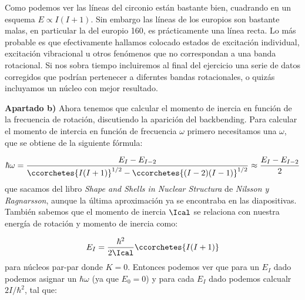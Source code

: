     Como podemos ver las líneas del circonio están bastante bien, cuadrando en un esquema $E \propto I(I+1)$. Sin embargo las líneas de los europios son bastante malas, en particular la del europio 160, es prácticamente una línea recta. Lo más probable es que efectivamente hallamos colocado estados de excitación individual, excitación vibracional u otros fenómenos que no correspondan a una banda rotacional. Si nos sobra tiempo incluiremos al final del ejercicio una serie de datos corregidos que podrían pertenecer a diferntes bandas rotacionales, o quizás incluyamos un núcleo con mejor resultado.


    \textbf{Apartado b)} Ahora tenemos que calcular el momento de inercia en función de la frecuencia de rotación, discutiendo la aparición del backbending. Para calcular el momento de intercia en función de frecuencia $\omega$ primero necesitamos una $\omega$, que se obtiene de la siguiente fórmula:

    \begin{equation}
        \hbar \omega =  \frac{E_{I}-E_{I-2}}{\ccorchetes{I(I+1)}^{1/2}-\ccorchetes{(I-2)(I-1)}^{1/2}} \approx \frac{E_I-E_{I-2}}{2}
    \end{equation}
    que sacamos del libro \textit{Shape and Shells in Nuclear Structura} de \textit{Nilsson y Ragnarsson}, aunque la última aproximación ya se encontraba en las diapositivas. También sabemos que el momento de inercia $\Ical$ se relaciona con nuestra energía de rotación  y momento de inercia como:

    \begin{equation}
        E_{I} = \frac{\hbar^2}{2\Ical} \ccorchetes{I(I+1)}
    \end{equation}
    para núcleos par-par donde $K=0$. Entonces podemos ver que para un $E_I$ dado podemos asignar un $\hbar \omega$ (ya que $E_0=0$) y para cada $E_I$ dado podemos calcualr $2I/\hbar^2$, tal que:

